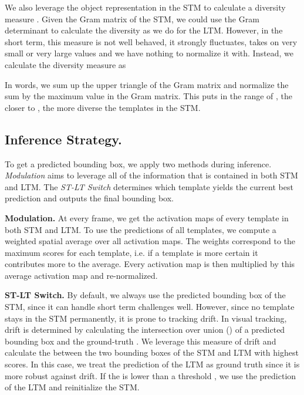 \documentclass{article}
\begin{document}
We also leverage the object representation in the STM to calculate a diversity measure . Given the Gram matrix  of the STM, we could use the Gram determinant to calculate the diversity as we do for the LTM. However, in the short term, this measure is not well behaved, it strongly fluctuates, takes on very small or very large values and we have nothing to normalize it with. Instead, we calculate the diversity measure as 
 
In words, we sum up the upper triangle of the Gram matrix and normalize the sum by the maximum value in the Gram matrix. This puts  in the range of , the closer  to , the more diverse the templates in the STM.

\subsection{Inference Strategy.} To get a predicted bounding box, we apply two methods during inference. \textit{Modulation} aims to leverage all of the information that is contained in both STM and LTM. The \textit{ST-LT Switch } determines which template yields the current best prediction and outputs the final bounding box.

\textbf{Modulation.} At every frame, we get the activation maps of every template in both STM and LTM. To use the predictions of all templates, we compute a weighted spatial average over all activation maps.  The weights correspond to the maximum scores for each template, i.e. if a template is more certain it contributes more to the average. Every activation map is then multiplied by this average activation map and re-normalized.

\textbf{ST-LT Switch.} By default, we always use the predicted bounding box of the STM, since it can handle short term challenges well. However, since no template stays in the STM permanently, it is prone to tracking drift. In visual tracking, drift is determined by calculating the intersection over union () of a predicted bounding box and the ground-truth \cite{VOT_TPAMI}. We leverage this measure of drift and calculate the  between the two bounding boxes of the STM and LTM with highest scores. In this case, we treat the prediction of the LTM as ground truth since it is more robust against drift. If the  is lower than a threshold , we use the prediction of the LTM and reinitialize the STM.
\end{document}
